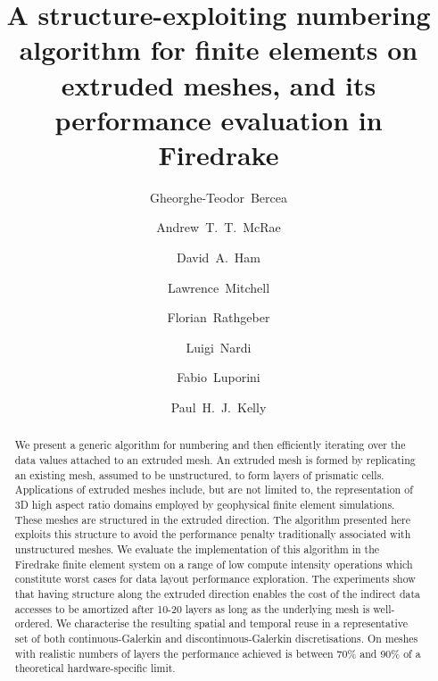\documentclass[11pt, a4paper]{scrartcl}
\begin{document}
\author[1,*]{Gheorghe-Teodor~Bercea}
\author[2,3,4]{Andrew~T.~T.~McRae}
\author[3]{David~A.~Ham}
\author[1,3]{Lawrence~Mitchell}
\author[1,5]{Florian~Rathgeber}
\author[1]{Luigi~Nardi}
\author[1]{Fabio~Luporini}
\author[1]{Paul~H.~J.~Kelly}


\title{A structure-exploiting numbering algorithm for finite elements on
  extruded meshes, and its performance evaluation in Firedrake}
\date{}

\maketitle

\begin{abstract}
  We present a generic algorithm for numbering and then efficiently
  iterating over the data values attached to an extruded mesh. An
  extruded mesh is formed by replicating an existing mesh, assumed to
  be unstructured, to form layers of prismatic cells. Applications of
  extruded meshes include, but are not limited to, the representation
  of 3D high aspect ratio domains employed by geophysical finite
  element simulations. These meshes are structured in the extruded
  direction. The algorithm presented here exploits this structure to
  avoid the performance penalty traditionally associated with
  unstructured meshes. We evaluate the implementation of this
  algorithm in the Firedrake finite element system on a range of low
  compute intensity operations which constitute worst cases for data
  layout performance exploration. The experiments show that having
  structure along the extruded direction enables the cost of the
  indirect data accesses to be amortized after 10-20 layers as long as
  the underlying mesh is well-ordered. We characterise the resulting
  spatial and temporal reuse in a representative set of both
  continuous-Galerkin and discontinuous-Galerkin discretisations. On
  meshes with realistic numbers of layers the performance achieved is
  between 70\% and 90\% of a theoretical hardware-specific limit.
\end{abstract}
\end{document}
